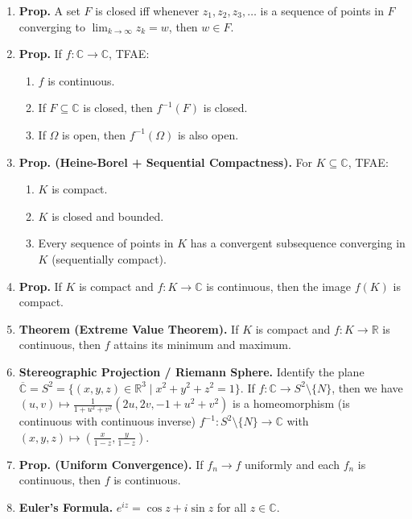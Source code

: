 \documentclass[12pt]{article}
\theoremstyle{definition}
\theoremstyle{named}
\begin{document}
{\begin{multicols}{2}
\begin{spacing}{1.01}
\begin{enumerate}
\begin{enumerate}
        \item The union of finitely many closed sets is closed. 
    \end{enumerate}
    \item \textbf{Prop. } A set $F$ is closed iff whenever $z_1,z_2,z_3,\dots$ is a sequence of points in $F$ converging to $\lim_{k \to \infty} z_k = w$, then $w \in F$. 
    \item \textbf{Prop. } If $f: \mathbb{C} \to \mathbb{C}$, TFAE: 
    \begin{enumerate}
        \item $f$ is continuous. 
        \item If $F \subseteq \mathbb{C}$ is closed, then $f^{-1}(F)$ is closed. 
        \item If $\Omega$ is open, then $f^{-1}(\Omega)$ is also open. 
    \end{enumerate}
    \item \textbf{Prop. (Heine-Borel + Sequential Compactness). } For $K \subseteq \mathbb{C}$, TFAE: 
    \begin{enumerate}
        \item $K$ is compact. 
        \item $K$ is closed and bounded. 
        \item Every sequence of points in $K$ has a convergent subsequence converging in $K$ (sequentially compact). 
    \end{enumerate} 
    \item \textbf{Prop. } If $K$ is compact and $f: K \to \mathbb{C}$ is continuous, then the image $f(K)$ is compact. 
    \item \textbf{Theorem (Extreme Value Theorem). } If $K$ is compact and $f: K \to \mathbb{R}$ is continuous, then $f$ attains its minimum and maximum. 
    \item \textbf{Stereographic Projection / Riemann Sphere. } Identify the plane $\overline{\mathbb{C}} = S^2 = \{(x,y,z) \in \mathbb{R}^3 \mid x^2 + y^2 + z^2 = 1\}$. If $f: \mathbb{C} \to S^2 \setminus \{N\}$, then we have $(u,v) \mapsto \frac{1}{1 + u^2 + v^2}(2u,2v,-1 + u^2 + v^2)$ is a homeomorphism (is continuous with continuous inverse) $f^{-1}: S^2 \setminus \{N\} \to \mathbb{C}$ with $(x,y,z) \mapsto \left(\frac{x}{1-z}, \frac{y}{1-z}\right)$. 
    \item \textbf{Prop. (Uniform Convergence). } If $f_n \to f$ uniformly and each $f_n$ is continuous, then $f$ is continuous. 
    \item \textbf{Euler's Formula. } $e^{iz} = \cos z + i\sin z$ for all $z \in \mathbb{C}$. 

\end{enumerate}
\end{spacing}
\end{multicols}}
\end{document}
